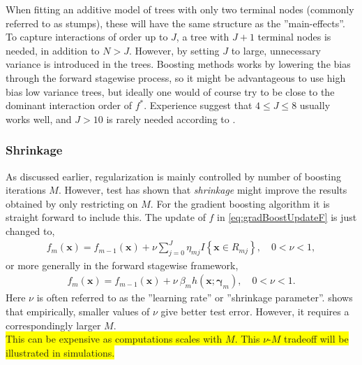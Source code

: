 When fitting an additive model of trees with only two terminal nodes (commonly referred to as stumps), these will have the same structure as the ''main-effects''. To capture interactions of order up to $J$, a tree with $J+1$  terminal nodes is needed, in addition to $N>J$. However, by setting $J$ to large, unnecessary variance is introduced in the trees. Boosting methods works by lowering the bias through the forward stagewise process, so it might be advantageous to use high bias low variance trees, but ideally one would of course try to be close to the dominant interaction order of $f^*$.
Experience suggest that $4 \leq J \leq 8$ usually works well, and $J>10$ is rarely needed according to \cite{modstat}.  

\subsubsection{Shrinkage}
\label{sub:Shrinkage}
As discussed earlier, regularization is mainly controlled by number of boosting iterations $M$. However, test has shown  \cite{copas1983} that \textit{shrinkage} might improve the results obtained by only restricting on $M$. For the gradient boosting algorithm it is straight forward to include this. 
The update of $f$ in \eqref{eq:gradBoostUpdateF} is just changed to,
\begin{align}
  f_m(\mathbf{x}) = f_{m-1}(\mathbf{x}) +  \nu \sum^{J}_{j=0} \eta_{m j} I\left\{ \mathbf{x} \in R_{m j} \right\}, \quad 0 < \nu < 1,
\end{align}
or more generally in the forward stagewise framework,
\begin{align}
  f_m(\mathbf{x}) = f_{m-1}(\mathbf{x}) +  \nu \: \beta_m h(\mathbf{x}; \bm \gamma_m), \quad 0 < \nu < 1.
\end{align}
Here $\nu$ is often referred to as the ''learning rate'' or ''shrinkage parameter''. \cite{friedman} shows that empirically, smaller values of $\nu$ give better test error. However, it requires a correspondingly larger $M$. 
\\\colorbox{yellow}{This can be expensive as computations scales with $M$. This $\nu$-$M$ tradeoff will be illustrated in simulations.}


